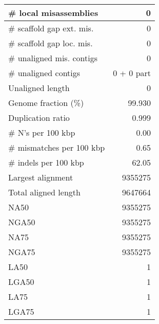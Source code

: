 \documentclass[12pt,a4paper]{article}
\begin{document}
\begin{table}[ht]
\begin{center}
\begin{tabular}{|l*{1}{|r}|}
\# local misassemblies & 0 \\ \hline
\# scaffold gap ext. mis. & 0 \\ \hline
\# scaffold gap loc. mis. & 0 \\ \hline
\# unaligned mis. contigs & 0 \\ \hline
\# unaligned contigs & 0 + 0 part \\ \hline
Unaligned length & 0 \\ \hline
Genome fraction (\%) & 99.930 \\ \hline
Duplication ratio & 0.999 \\ \hline
\# N's per 100 kbp & 0.00 \\ \hline
\# mismatches per 100 kbp & 0.65 \\ \hline
\# indels per 100 kbp & 62.05 \\ \hline
Largest alignment & 9355275 \\ \hline
Total aligned length & 9647664 \\ \hline
NA50 & 9355275 \\ \hline
NGA50 & 9355275 \\ \hline
NA75 & 9355275 \\ \hline
NGA75 & 9355275 \\ \hline
LA50 & 1 \\ \hline
LGA50 & 1 \\ \hline
LA75 & 1 \\ \hline
LGA75 & 1 \\ \hline
\end{tabular}
\end{center}
\end{table}
\end{document}
